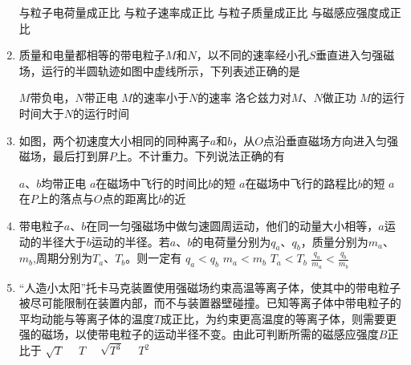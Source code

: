 \begin{enumerate}[leftmargin=0em]
\fourchoices
{与粒子电荷量成正比}
{与粒子速率成正比}
{与粒子质量成正比}
{与磁感应强度成正比}


\item
{}
质量和电量都相等的带电粒子$ M $和$ N $，以不同的速率经小孔$ S $垂直进入匀强磁场，运行的半圆轨迹如图中虚线所示，下列表述正确的是  
\begin{figure}[h!]
\centering

\end{figure}


\fourchoices
{$ M $带负电，$ N $带正电}
{$ M $的速率小于$ N $的速率}
{洛仑兹力对$ M $、$ N $做正功}
{$ M $的运行时间大于$ N $的运行时间}



\item
{}
如图，两个初速度大小相同的同种离子$ a $和$ b $，从$ O $点沿垂直磁场方向进入匀强磁场，最后打到屏$ P $上。不计重力。下列说法正确的有  


\begin{minipage}[h!]{0.7\linewidth}
\vspace{0.3em}
\fourchoices
{$ a $、$ b $均带正电}
{$ a $在磁场中飞行的时间比$ b $的短}
{$ a $在磁场中飞行的路程比$ b $的短}
{$ a $在$ P $上的落点与$ O $点的距离比$ b $的近}

\vspace{0.3em}
\end{minipage}
\hfill
\begin{minipage}[h!]{0.3\linewidth}
\flushright
\vspace{0.3em}

\vspace{0.3em}
\end{minipage}



\item
{}
带电粒子$ a $、$ b $在同一匀强磁场中做匀速圆周运动，他们的动量大小相等，$ a $运动的半径大于$ b $运动的半径。若$ a $、$ b $的电荷量分别为$ q_a $、$ q_b $，质量分别为$ m_a $、$ m_b $,周期分别为$ T_a $、$ T_b $。则一定有  
\fourchoices
{$q _ { a } < q _ { b } $}
{$m _ { a } < m _ { b } $}
{$ T _ { a } < T _ { b } $}
{$\frac { q _ { a } } { m _ { a } } < \frac { q _ { b } } { m _ { b } }$}



\item
{}
“人造小太阳”托卡马克装置使用强磁场约束高温等离子体，使其中的带电粒子被尽可能限制在装置内部，而不与装置器壁碰撞。已知等离子体中带电粒子的平均动能与等离子体的温度$ T $成正比，为约束更高温度的等离子体，则需要更强的磁场，以使带电粒子的运动半径不变。由此可判断所需的磁感应强度$ B $正比于  
\fourchoices
{$\sqrt { T } \quad$}
{$T \quad$}
{$\sqrt { T ^ { 3 } } \quad$}
{$T ^ { 2 }$}




\end{enumerate}
